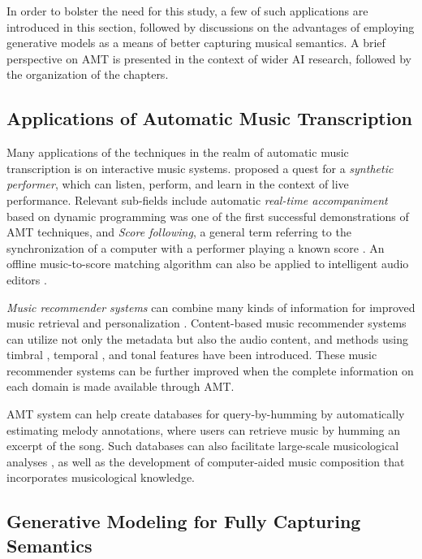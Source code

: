 In order to bolster the need for this study, a few of such applications are introduced in this section, followed by discussions on the advantages of employing generative models as a means of better capturing musical semantics.
A brief perspective on AMT is presented in the context of wider AI research, followed by the organization of the chapters.


\subsection{Applications of Automatic Music Transcription}\label{sec:applications}

Many applications of the techniques in the realm of automatic music transcription is on interactive music systems.
 proposed a quest for a \emph{synthetic performer}, which can listen, perform, and learn in the context of live performance.
Relevant sub-fields include automatic \emph{real-time accompaniment} \cite{dannenberg1985accompaniment} based on dynamic programming was one of the first successful demonstrations of AMT techniques, and \emph{Score following}, a general term referring to the synchronization of a computer with a performer playing a known score \cite{orio2003following}.
An offline music-to-score matching algorithm can also be applied to intelligent audio editors \cite{dannenberg2003following}.

\emph{Music recommender systems} can combine many kinds of information for improved music retrieval and personalization \cite{celma2010music}.
Content-based music recommender systems can utilize not only the metadata but also the audio content, and methods using timbral \cite{magno2008recommendation}, temporal \cite{li2007recommender}, and tonal features \cite{lu2009recommendation} have been introduced.
These music recommender systems can be further improved when the complete information on each domain is made available through AMT.

AMT system can help create databases for query-by-humming \cite{ghias1995humming} by automatically estimating melody annotations, where users can retrieve music by humming an excerpt of the song.
Such databases can also facilitate large-scale musicological analyses \cite{abdallah2015british}, as well as the development of computer-aided music composition \cite{agostini2013aid} that incorporates musicological knowledge.


\subsection{Generative Modeling for Fully Capturing Semantics}

